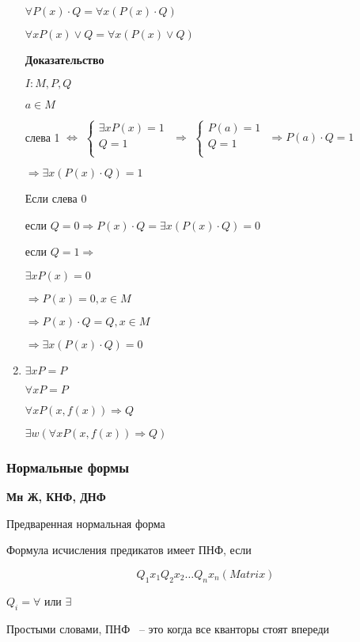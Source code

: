 \documentclass[russian]{lecture-notes}
\begin{document}
\begin{enumerate}
{	$\forall P(x) \cdot Q = \forall x (P(x) \cdot Q)$
	
	$\forall x P(x) \lor Q = \forall x (P(x) \lor Q)$

	\textbf{Доказательство}
	
	$I: M, P, Q$
	
	$a \in M$	
	
	слева 1 $\Leftrightarrow$
	$\left \{ 
  		\begin{gathered} 
    			\exists x P(x) = 1 \\         
        		Q = 1 \\
	  	\end{gathered} 
	\right.$
	$\Rightarrow$
	$\left \{ 
  		\begin{gathered} 
    			P(a) = 1 \\         
        		Q = 1 \\
	  	\end{gathered} 
	\right.$
	$\Rightarrow P(a) \cdot Q = 1$
	
	$\Rightarrow \exists x (P(x) \cdot Q) = 1$
	
	Если слева 0
	
	если $Q = 0 \Rightarrow P(x) \cdot Q = \exists x (P(x) \cdot Q) = 0$
	
	если $Q = 1 \Rightarrow$ 
	
	$\exists x P(x) = 0 $

	$\Rightarrow P(x) = 0, x \in M$ 

	$\Rightarrow P(x) \cdot Q = Q, x \in M $

	$\Rightarrow \exists x (P(x) \cdot Q) = 0$	
	
}

\item{
	$\exists x P = P$
	
	$\forall x P = P$
	
	\begin{example}
		$\forall x P(x, f(x)) \Rightarrow Q$
		
		$\exists w (\forall x P(x, f(x)) \Rightarrow Q)$
	\end{example}
}

\end{enumerate}

\subsubsection{Нормальные формы}

	\textbf{Мн Ж, КНФ, ДНФ}
	
\begin{definition}
	Предваренная нормальная форма
	
	Формула исчисления предикатов имеет ПНФ, если 
	
	$$Q_1 x_1 Q_2 x_2 \dots Q_n x_n (  Matrix  )$$
	
	$Q_i = \forall$ или $\exists$
	
	Простыми словами, ПНФ ~-- это когда все кванторы стоят впереди
\end{definition}
\end{document}
